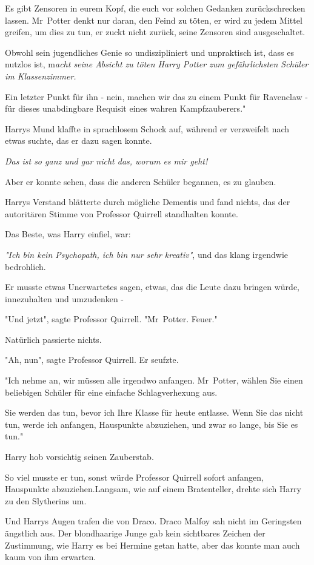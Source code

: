 {Es gibt Zensoren in eurem Kopf, die euch vor solchen Gedanken zurückschrecken lassen. Mr~Potter denkt nur daran, den Feind zu töten, er wird zu jedem Mittel greifen, um dies zu tun, er zuckt nicht zurück, seine Zensoren sind ausgeschaltet.

Obwohl sein jugendliches Genie so undiszipliniert und unpraktisch ist, dass es nutzlos ist, m\emph{acht seine Absicht zu töten Harry Potter zum gefährlichsten Schüler im Klassenzimmer.}

Ein letzter Punkt für ihn - nein, machen wir das zu einem Punkt für Ravenclaw - für dieses unabdingbare Requisit eines wahren Kampfzauberers."

Harrys Mund klaffte in sprachlosem Schock auf, während er verzweifelt nach etwas suchte, das er dazu sagen konnte.

\emph{Das ist so ganz und gar nicht das, worum es mir geht!}

Aber er konnte sehen, dass die anderen Schüler begannen, es zu glauben.

Harrys Verstand blätterte durch mögliche Dementis und fand nichts, das der autoritären Stimme von Professor Quirrell standhalten konnte.

Das Beste, was Harry einfiel, war:

\emph{"Ich bin kein Psychopath, ich bin nur sehr kreativ"}, und das klang irgendwie bedrohlich.

Er musste etwas Unerwartetes sagen, etwas, das die Leute dazu bringen würde, innezuhalten und umzudenken -

"Und jetzt", sagte Professor Quirrell. "Mr~Potter. Feuer."

Natürlich passierte nichts.

"Ah, nun", sagte Professor Quirrell. Er seufzte.

"Ich nehme an, wir müssen alle irgendwo anfangen. Mr~Potter, wählen Sie einen beliebigen Schüler für eine einfache Schlagverhexung aus.

Sie werden das tun, bevor ich Ihre Klasse für heute entlasse. Wenn Sie das nicht tun, werde ich anfangen, Hauspunkte abzuziehen, und zwar so lange, bis Sie es tun."

Harry hob vorsichtig seinen Zauberstab.

So viel musste er tun, sonst würde Professor Quirrell sofort anfangen, Hauspunkte abzuziehen.Langsam, wie auf einem Bratenteller, drehte sich Harry zu den Slytherins um.

Und Harrys Augen trafen die von Draco. Draco Malfoy sah nicht im Geringsten ängstlich aus. Der blondhaarige Junge gab kein sichtbares Zeichen der Zustimmung, wie Harry es bei Hermine getan hatte, aber das konnte man auch kaum von ihm erwarten.

}
